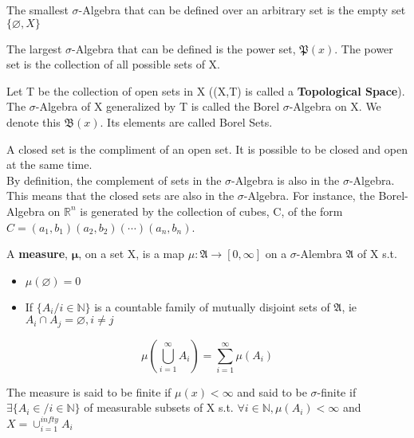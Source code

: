 \begin{ex}
	The smallest $\sigma$-Algebra that can be defined over an arbitrary set is the empty set $\{\varnothing,X\}$
\end{ex}

\begin{ex}
	The largest $\sigma$-Algebra that can be defined is the power set, $\mathfrak{P}(x)$. The power set is the collection of all possible sets of X.
\end{ex}

\begin{ex}
	Let T be the collection of open sets in X ((X,T) is called a \textbf{Topological Space}). The $\sigma$-Algebra of X generalized by T is called the Borel $\sigma$-Algebra on X. We denote this $\mathfrak{B}(x)$. Its elements are called Borel Sets. 
\end{ex}

 A closed set is the compliment of an open set. It is possible to be closed and open at  the same time. \\
 By definition, the complement of sets in the $\sigma$-Algebra is also in the $\sigma$-Algebra. This means that the closed sets are also in the $\sigma$-Algebra. For instance, the Borel-Algebra on $\mathbb{R}^{n}$ is generated by the collection of cubes, C, of the form $C=(a_{1},b_{1})(a_{2},b_{2})(\dotsm)(a_{n},b_{n})$. \\

\begin{leftbar}
\begin{define}
	A \textbf{measure}, $\bm{\mu}$, on a set X, is a map $\mu:\mathfrak{A}\rightarrow[0,\infty]$ on a $\sigma$-Alembra $\mathfrak{A}$ of X s.t.
	\begin{itemize}
		\item $\mu(\varnothing)=0$
		\item If $\{A_{i}/i\in\mathbb{N}\}$ is a countable family of mutually disjoint sets of $\mathfrak{A}$, ie $A_{i}\cap A_{j}=\varnothing, i\neq j$
	\end{itemize}
    \[
    \mu(\bigcup_{i=1}^{\infty}A_{i})=\sum_{i=1}^{\infty}\mu(A_{i})
    \]
\end{define}
\end{leftbar}

The measure is said to be finite if $\mu(x)<\infty$ and said to be $\sigma$-finite if $\exists\{A_{i}\in/i\in\mathbb{N} \}$ of measurable subsets of X s.t. $\forall i\in\mathbb{N},\mu(A_{i})<\infty$ and $X=\cup_{i=1}^{infty}A_{i}$

%